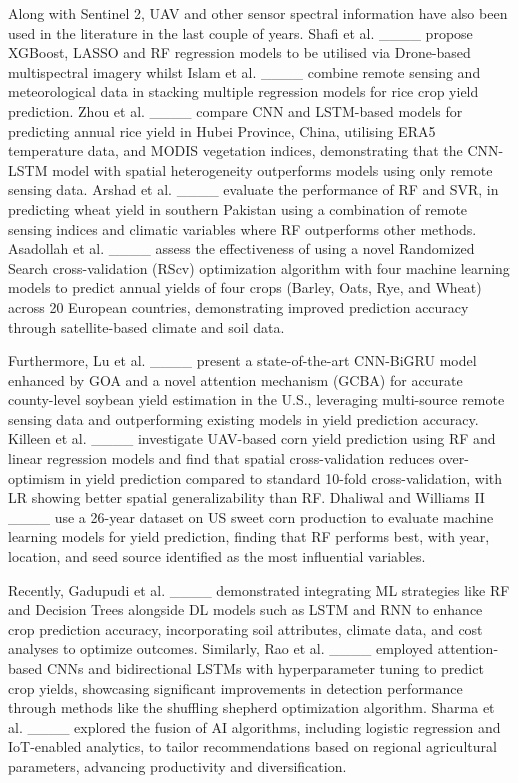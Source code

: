 Along with Sentinel 2, UAV and other sensor spectral information have also been used in the literature in the last couple of years. Shafi et al. ____ propose XGBoost, LASSO and RF regression models to be utilised via Drone-based multispectral imagery whilst Islam et al. ____ combine remote sensing and meteorological data in stacking multiple regression models for rice crop yield prediction. Zhou et al. ____ compare CNN and LSTM-based models for predicting annual rice yield in Hubei Province, China, utilising ERA5 temperature data, and MODIS vegetation indices, demonstrating that the CNN-LSTM model with spatial heterogeneity outperforms models using only remote sensing data. Arshad et al. ____ evaluate the performance of RF and SVR, in predicting wheat yield in southern Pakistan using a combination of remote sensing indices and climatic variables where RF outperforms other methods. Asadollah et al. ____ assess the effectiveness of using a novel Randomized Search cross-validation (RScv) optimization algorithm with four machine learning models to predict annual yields of four crops (Barley, Oats, Rye, and Wheat) across 20 European countries, demonstrating improved prediction accuracy through satellite-based climate and soil data. 

Furthermore, Lu et al. ____ present a state-of-the-art CNN-BiGRU model enhanced by GOA and a novel attention mechanism (GCBA) for accurate county-level soybean yield estimation in the U.S., leveraging multi-source remote sensing data and outperforming existing models in yield prediction accuracy. Killeen et al. ____ investigate UAV-based corn yield prediction using RF and linear regression models and find that spatial cross-validation reduces over-optimism in yield prediction compared to standard 10-fold cross-validation, with LR showing better spatial generalizability than RF. Dhaliwal and Williams II ____ use a 26-year dataset on US sweet corn production to evaluate machine learning models for yield prediction, finding that RF performs best, with year, location, and seed source identified as the most influential variables.

Recently, Gadupudi et al. ____ demonstrated integrating ML strategies like RF and Decision Trees alongside DL models such as LSTM and RNN to enhance crop prediction accuracy, incorporating soil attributes, climate data, and cost analyses to optimize outcomes. Similarly, Rao et al. ____ employed attention-based CNNs and bidirectional LSTMs with hyperparameter tuning to predict crop yields, showcasing significant improvements in detection performance through methods like the shuffling shepherd optimization algorithm. Sharma et al. ____ explored the fusion of AI algorithms, including logistic regression and IoT-enabled analytics, to tailor recommendations based on regional agricultural parameters, advancing productivity and diversification. 

